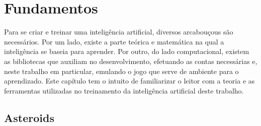 
\chapter{Fundamentos}
\label{cap:fundamentos}

Para se criar e treinar uma inteligência artificial, diversos arcabouçous são necessários. Por um lado, existe a parte teórica e matemática na qual a inteligência se baseia para aprender. Por outro, do lado computacional, existem as bibliotecas que auxiliam no desenvolvimento, efetuando as contas necessárias e, neste trabalho em particular, emulando o jogo que serve de ambiente para o aprendizado.
Este capítulo tem o intuito de familiarizar o leitor com a teoria e as ferramentas utilizadas no treinamento da inteligência artificial deste trabalho.

\section{Asteroids}
\label{sec:asteroids}

